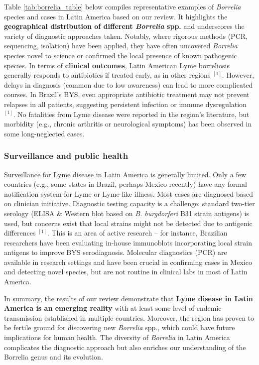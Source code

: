 \documentclass[11pt,letterpaper]{article}
\newcommand{\mycite}[1]{$^{[#1]}$}
\begin{document}
Table \ref{tab:borrelia_table} below compiles representative examples of \textit{Borrelia} species and cases in Latin America based on our review. It highlights the \textbf{geographical distribution of different \textit{Borrelia} spp.} and underscores the variety of diagnostic approaches taken. Notably, where rigorous methods (PCR, sequencing, isolation) have been applied, they have often uncovered \textit{Borrelia} species novel to science or confirmed the local presence of known pathogenic species. In terms of \textbf{clinical outcomes}, Latin American Lyme borreliosis generally responds to antibiotics if treated early, as in other regions \mycite{1}. However, delays in diagnosis (common due to low awareness) can lead to more complicated courses. In Brazil's BYS, even appropriate antibiotic treatment may not prevent relapses in all patients, suggesting persistent infection or immune dysregulation \mycite{1}. No fatalities from Lyme disease were reported in the region's literature, but morbidity (e.g., chronic arthritis or neurological symptoms) has been observed in some long-neglected cases.

\subsubsection{Surveillance and public health}
Surveillance for Lyme disease in Latin America is generally limited. Only a few countries (e.g., some states in Brazil, perhaps Mexico recently) have any formal notification system for Lyme or Lyme-like illness. Most cases are diagnosed based on clinician initiative. Diagnostic testing capacity is a challenge: standard two-tier serology (ELISA \& Western blot based on \textit{B. burgdorferi} B31 strain antigens) is used, but concerns exist that local strains might not be detected due to antigenic differences \mycite{1}. This is an area of active research – for instance, Brazilian researchers have been evaluating in-house immunoblots incorporating local strain antigens to improve BYS serodiagnosis. Molecular diagnostics (PCR) are available in research settings and have been crucial in confirming cases in Mexico and detecting novel species, but are not routine in clinical labs in most of Latin America.

In summary, the results of our review demonstrate that \textbf{Lyme disease in Latin America is an emerging reality} with at least some level of endemic transmission established in multiple countries. Moreover, the region has proven to be fertile ground for discovering new \textit{Borrelia} spp., which could have future implications for human health. The diversity of \textit{Borrelia} in Latin America complicates the diagnostic approach but also enriches our understanding of the Borrelia genus and its evolution.
\end{document}

